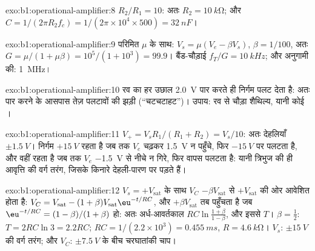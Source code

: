 \begin{solution}{exo:b1:operational-amplifier:8}
$R_2/R_1 = 10$: अतः $R_2 = \qty{10}{k\ohm}$; और $C = 1/(2\pi R_2f_c) = 1/(2\pi
\times 10^4 \times 500) = \qty{32}{nF}$।
\end{solution}

\begin{solution}{exo:b1:operational-amplifier:9}
परिमित $\mu$ के साथ: $V_s = \mu(V_e - \beta V_s)$, $\beta = 1/100$, अतः
$G = \mu/(1 + \mu\beta) = 10^5/(1 + 10^3) = 99.9$। बैंड-चौड़ाई $f_T/G =
\qty{10}{kHz}$; और अनुगामी की: \qty{1}{MHz}।
\end{solution}

\begin{solution}{exo:b1:operational-amplifier:10}
रव का हर उछाल \qty{2.0}{V} पार करते ही निर्गम पलट देता है: अतः पार करने के
आसपास तेज़ पलटावों की झड़ी (``चटचटाहट'')। उपाय: रव से चौड़ा शैथिल्य, यानी
कोई ।
\end{solution}

\begin{solution}{exo:b1:operational-amplifier:11}
$V_+ = V_sR_1/(R_1 + R_2) = V_s/10$: अतः देहलियाँ $\pm\qty{1.5}{V}$।
निर्गम $+\qty{15}{V}$ रहता है जब तक $V_e$ चढ़कर \qty{1.5}{V} न पहुँचे, फिर
$-\qty{15}{V}$ पर पलटता है, और वहीं रहता है जब तक $V_e$ \qty{-1.5}{V} से नीचे
न गिरे, फिर वापस पलटता है: यानी त्रिभुज की ही आवृत्ति की वर्ग तरंग, जिसके
किनारे देहली-पारण पर पड़ते हैं।
\end{solution}

\begin{solution}{exo:b1:operational-amplifier:12}
$V_s = +V_{\mathrm{sat}}$ के साथ $V_C$ $-\beta V_{\mathrm{sat}}$ से
$+V_{\mathrm{sat}}$ की ओर आवेशित होता है: $V_C = V_{\mathrm{sat}} - (1 + \beta)V_{\mathrm{sat}}
\eu^{-t/RC}$, और $+\beta V_{\mathrm{sat}}$ तब पहुँचता है जब $\eu^{-t/RC} =
(1 - \beta)/(1 + \beta)$ हो: अतः अर्ध-आवर्तकाल $RC\ln\frac{1 + \beta}{1 - \beta}$,
और इससे $T$। $\beta = \tfrac12$: $T = 2RC\ln 3 = 2.2RC$; $RC = 1/(2.2 \times
10^3) = \qty{0.455}{ms}$, $R = \qty{4.6}{k\ohm}$। $V_s$: $\pm\qty{15}{V}$ की
वर्ग तरंग; और $V_C$: $\pm\qty{7.5}{V}$ के बीच चरघातांकी चाप।
\end{solution}


